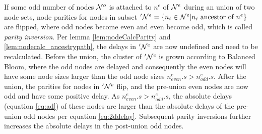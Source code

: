 If some odd number of nodes $\mathcal{N}^o$ is attached to $n^e$ of $\mathcal{N}^e$ during an union of two node sets, node parities for nodes in subset $'\mathcal{N}^e= \{n_i \in \mathcal{N}^e | n_i \mbox{ ancestor of } n^e\}$ are flipped, where odd nodes become even and even become odd, which is called \emph{parity inversion}. Per lemma \ref{lem:nodeCalcParity} and \ref{lem:nodecalc_ancestrypath}, the delays in $'\mathcal{N}^e$ are now undefined and need to be recalculated. Before the union, the cluster of $'\mathcal{N}^e$ is grown according to Balanced Bloom, where the odd nodes are delayed and consequently the even nodes will have some node sizes larger than the odd node sizes $n^e_{even}.s > n^e_{odd}.s$.
After the union, the parities for nodes in $'\mathcal{N}^e$ flip, and the pre-union even nodes are now odd and have some positive delay. As $n^e_{even}.s > n^e_{odd}.s$, the absolute delays (equation \eqref{eq:ad}) of these nodes are larger than the absolute delays of the pre-union odd nodes per equation \eqref{eq:2ddelay}. Subsequent parity inversions further increases the absolute delays in the post-union odd nodes.

